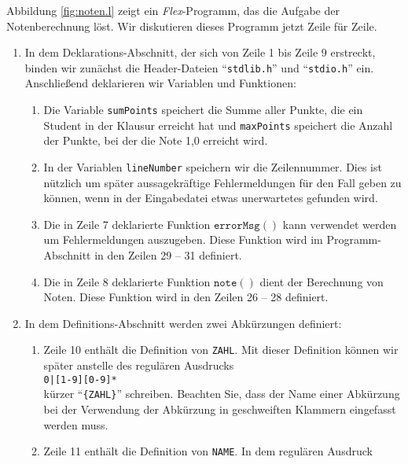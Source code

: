 Abbildung \ref{fig:noten.l} zeigt ein \textsl{Flex}-Programm, das die Aufgabe der Notenberechnung
l\"ost.  Wir diskutieren dieses Programm jetzt Zeile f\"ur Zeile.
\begin{enumerate}
\item In dem Deklarations-Abschnitt, der sich von Zeile 1 bis Zeile 9 erstreckt, binden wir
      zun\"achst die Header-Dateien ``\texttt{stdlib.h}'' und ``\texttt{stdio.h}'' ein.  
      Anschlie{\ss}end deklarieren wir Variablen und Funktionen:
      \begin{enumerate}
      \item Die Variable \texttt{sumPoints} speichert die Summe aller Punkte, die ein Student 
            in der Klausur erreicht hat und \texttt{maxPoints} speichert die Anzahl der 
            Punkte, bei der die Note 1,0 erreicht wird.
      \item In der Variablen \texttt{lineNumber} speichern wir die Zeilennummer.
            Dies ist n\"utzlich um sp\"ater aussagekr\"aftige Fehlermeldungen f\"ur den Fall geben
            zu k\"onnen, wenn in der Eingabedatei etwas unerwartetes gefunden wird.
      \item Die in Zeile 7 deklarierte Funktion $\texttt{errorMsg}()$ kann verwendet werden
            um Fehlermeldungen auszugeben.
            Diese Funktion wird im Programm-Abschnitt in den Zeilen 29 -- 31 definiert.  
      \item Die in Zeile 8 deklarierte Funktion $\texttt{note}()$ dient der Berechnung von Noten.
            Diese Funktion wird in den Zeilen 26 -- 28 definiert.
      \end{enumerate}
\item In dem Definitions-Abschnitt werden zwei Abk\"urzungen definiert:
      \begin{enumerate}
      \item Zeile 10 enth\"alt die Definition von \texttt{ZAHL}.  Mit dieser Definition k\"onnen
            wir sp\"ater anstelle des regul\"aren Ausdrucks
            \\[0.2cm]
            \hspace*{1.3cm}
            \texttt{0|[1-9][0-9]*}
            \\[0.2cm]
            k\"urzer ``\texttt{\{ZAHL\}}'' schreiben.  Beachten Sie, dass der Name einer Abk\"urzung
            bei der Verwendung der Abk\"urzung in geschweiften Klammern eingefasst werden muss.
      \item Zeile 11 enth\"alt die Definition von \texttt{NAME}.  In dem regul\"aren Ausdruck

\end{enumerate}
\end{enumerate}
